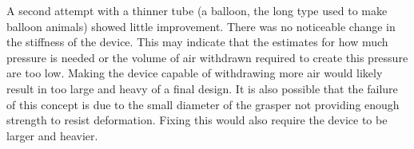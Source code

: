 A second attempt with a thinner tube (a balloon, the long type used to make balloon animals) showed little improvement. 
There was no noticeable change in the stiffness of the device. This may indicate that the estimates for how much pressure is needed
or the volume of air withdrawn required to create this pressure are too low. Making the device capable of withdrawing more air would likely
result in too large and heavy of a final design. It is also possible that the failure of this concept is due to the small diameter of the
grasper not providing enough strength to resist deformation. Fixing this would also require the device to be larger and heavier.

